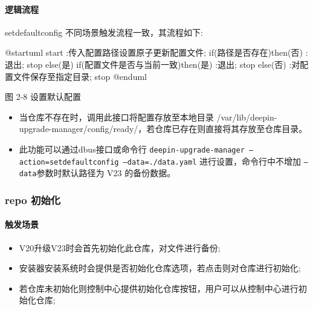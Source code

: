 \documentclass{utart}
\begin{document}
\paragraph{逻辑流程}
setdefaultconfig 不同场景触发流程一致，其流程如下:
\begin{center}
  \begin{adjustbox}{scale=0.65}
    \begin{plantuml}
      @startuml
      start
      :传入配置路径设置原子更新配置文件;
      if(路径是否存在)then(否)
      :退出;
      stop
      else(是)
      if(配置文件是否与当前一致)then(是)
      :退出;
      stop
      else(否)
      :对配置文件保存至指定目录;
      stop
      @enduml
    \end{plantuml}
  \end{adjustbox}

    图 2-8 设置默认配置
\end{center}
\begin{itemize}[leftmargin=4em]
  \item 当仓库不存在时，调用此接口将配置存放至本地目录 /var/lib/deepin-upgrade-manager/config/ready/，若仓库已存在则直接将其存放至仓库目录。
  \item 此功能可以通过dbus接口或命令行 \texttt{deepin-upgrade-manager --action=setdefaultconfig --data=./data.yaml} 进行设置，命令行中不增加 \texttt{--data}参数时默认路径为 V23 的备份数据。
\end{itemize}

\subsubsection{repo 初始化}
\paragraph{触发场景}
\begin{itemize}[leftmargin=4em]
  \item V20升级V23时会首先初始化此仓库，对文件进行备份;
  \item 安装器安装系统时会提供是否初始化仓库选项，若点击则对仓库进行初始化;
  \item 若仓库未初始化则控制中心提供初始化仓库按钮，用户可以从控制中心进行初始化仓库;
\end{itemize}
\end{document}
